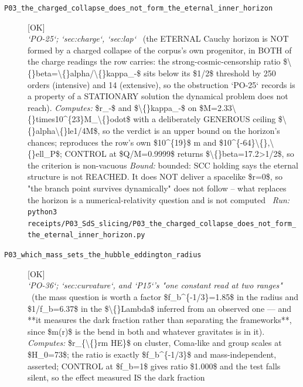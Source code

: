 \begin{description}
\item[\label{rcpt:P03_the_charged_collapse_does_not_form_the_eternal_inner_horizon}\texttt{P03\_the\_charged\_collapse\_does\_not\_form\_the\_eternal\_inner\_horizon}]\hfill\textsf{[OK]}\\
\textit{`PO-25`; `sec:charge`, `sec:lap`} \ (the ETERNAL Cauchy horizon is NOT formed by a charged collapse of the corpus's own progenitor, in BOTH of the charge readings the row carries: the strong-cosmic-censorship ratio \$\textbackslash\{\}beta=\textbackslash\{\}alpha/\textbackslash\{\}kappa\_-\$ sits below its \$1/2\$ threshold by 250 orders (intensive) and 14 (extensive), so the obstruction `PO-25` records is a property of a STATIONARY solution the dynamical problem does not reach). 
\emph{Computes:} \$r\_-\$ and \$\textbackslash\{\}kappa\_-\$ on \$M=2.33\textbackslash\{\}times10\textasciicircum{}\{23\}M\_\textbackslash\{\}odot\$ with a deliberately GENEROUS ceiling \$\textbackslash\{\}alpha\textbackslash\{\}le1/4M\$, so the verdict is an upper bound on the horizon's chances; reproduces the row's own \$10\textasciicircum{}\{19\}\$ m and \$10\textasciicircum{}\{-64\}\textbackslash\{\},\textbackslash\{\}ell\_P\$; CONTROL at \$Q/M=0.9999\$ returns \$\textbackslash\{\}beta=17.2>1/2\$, so the criterion is non-vacuous
 \emph{Bound:} bounded: SCC holding says the eternal structure is not REACHED. It does NOT deliver a spacelike \$r=0\$, so "the branch point survives dynamically" does not follow -- what replaces the horizon is a numerical-relativity question and is not computed
\ \emph{Run:} \texttt{python3 receipts/P03\_SdS\_slicing/P03\_the\_charged\_collapse\_does\_not\_form\_the\_eternal\_inner\_horizon.py}
\item[\label{rcpt:P03_which_mass_sets_the_hubble_eddington_radius}\texttt{P03\_which\_mass\_sets\_the\_hubble\_eddington\_radius}]\hfill\textsf{[OK]}\\
\textit{`PO-36`; `sec:curvature`, and `P15`'s "one constant read at two ranges"} \ (the mass question is worth a factor \$f\_b\textasciicircum{}\{-1/3\}=1.85\$ in the radius and \$1/f\_b=6.37\$ in the \$\textbackslash\{\}Lambda\$ inferred from an observed one --- and **it measures the dark fraction rather than separating the frameworks**, since \$m(r)\$ is the bend in both and whatever gravitates is in it). 
\emph{Computes:} \$r\_\{\textbackslash\{\}rm HE\}\$ on cluster, Coma-like and group scales at \$H\_0=73\$; the ratio is exactly \$f\_b\textasciicircum{}\{-1/3\}\$ and mass-independent, asserted; CONTROL at \$f\_b=1\$ gives ratio \$1.000\$ and the test falls silent, so the effect measured IS the dark fraction

\end{description}
